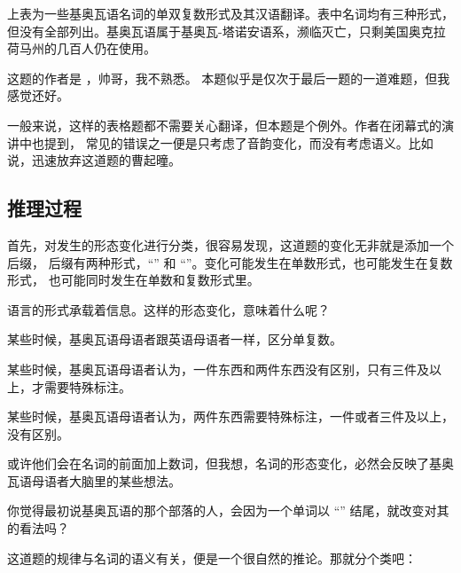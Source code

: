 上表为一些基奥瓦语名词的单双复数形式及其汉语翻译。表中名词均有三种形式，
但没有全部列出。基奥瓦语属于基奥瓦-塔诺安语系，濒临灭亡，只剩美国奥克拉荷马州的几百人仍在使用。

这题的作者是 ，帅哥，我不熟悉。
本题似乎是仅次于最后一题的一道难题，但我感觉还好。

一般来说，这样的表格题都不需要关心翻译，但本题是个例外。作者在闭幕式的演讲中也提到，
常见的错误之一便是只考虑了音韵变化，而没有考虑语义。比如说，迅速放弃这道题的曹起曈。

\subsection{推理过程}

首先，对发生的形态变化进行分类，很容易发现，这道题的变化无非就是添加一个后缀，
后缀有两种形式，“” 和 “”。变化可能发生在单数形式，也可能发生在复数形式，
也可能同时发生在单数和复数形式里。

语言的形式承载着信息。这样的形态变化，意味着什么呢？

某些时候，基奥瓦语母语者跟英语母语者一样，区分单复数。

某些时候，基奥瓦语母语者认为，一件东西和两件东西没有区别，只有三件及以上，才需要特殊标注。

某些时候，基奥瓦语母语者认为，两件东西需要特殊标注，一件或者三件及以上，没有区别。

或许他们会在名词的前面加上数词，但我想，名词的形态变化，必然会反映了基奥瓦语母语者大脑里的某些想法。

你觉得最初说基奥瓦语的那个部落的人，会因为一个单词以 “” 结尾，就改变对其的看法吗？

这道题的规律与名词的语义有关，便是一个很自然的推论。那就分个类吧：

